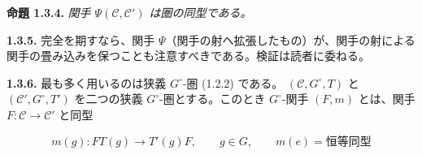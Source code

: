 \noindent\textbf{命題 1.3.4.}\quad
\emph{関手 $\Psi(\mathcal C,\mathcal C')$ は圏の同型である。}

\noindent\textbf{1.3.5.}\quad
完全を期すなら、関手 $\Psi$（関手の射へ拡張したもの）が、関手の射による
関手の畳み込みを保つことも注意すべきである。検証は読者に委ねる。

\noindent\textbf{1.3.6.}\quad
最も多く用いるのは狭義 $G^\circ$-圏 (1.2.2) である。
$(\mathcal C,G^\circ,T)$ と $(\mathcal C',G^\circ,T')$ を二つの狭義
$G^\circ$-圏とする。このとき $G^\circ$-関手 $(F,m)$ とは、関手
$F\colon\mathcal C\to\mathcal C'$ と同型

\begin{equation}
  m(g)\colon FT(g)\longrightarrow T'(g)F,
  \qquad g\in G,
  \qquad m(e)=\text{恒等同型}
  \tag{1.3.6.1}
\end{equation}
